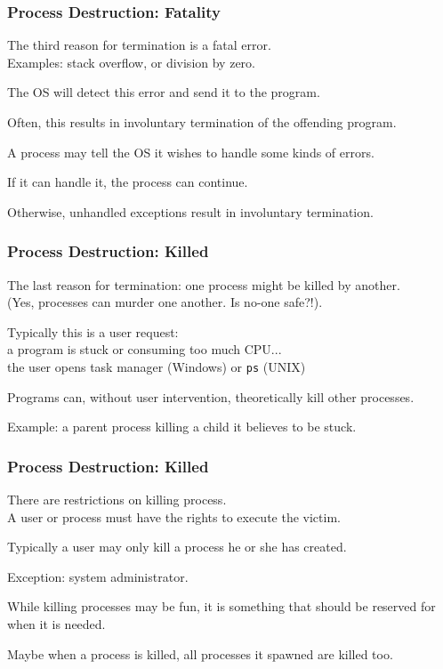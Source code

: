 \begin{frame}
\frametitle{Process Destruction: Fatality}

The third reason for termination is a fatal error.\\
\quad Examples: stack overflow, or division by zero. 

The OS will detect this error and send it to the program. 

Often, this results in involuntary termination of the offending program. 

A process may tell the OS it wishes to handle some kinds of errors.

If it can handle it, the process can continue.

Otherwise, unhandled exceptions result in involuntary termination.

\end{frame}

\begin{frame}
\frametitle{Process Destruction: Killed}

The last reason for termination: one process might be killed by another.\\
\quad (Yes, processes can murder one another. Is no-one safe?!). 

Typically this is a user request:\\
\quad a program is stuck or consuming too much CPU...\\
\quad the user opens task manager (Windows) or \texttt{ps} (UNIX)

Programs can, without user intervention, theoretically kill other processes. 

Example: a parent process killing a child it believes to be stuck.

\end{frame}

\begin{frame}
\frametitle{Process Destruction: Killed}

There are restrictions on killing process.\\
\quad A user or process must have the rights to execute the victim. 

Typically a user may only kill a process he or she has created.

Exception: system administrator. 

While killing processes may be fun, it is something that should be reserved for when it is needed.

Maybe when a process is killed, all processes it spawned are killed too.


\end{frame}


